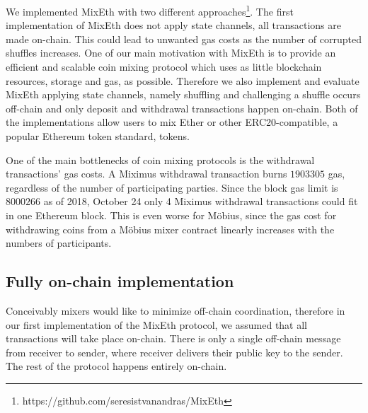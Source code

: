 \documentclass[conference, compsoc]{IEEEtran}
\theoremstyle{definition}
\begin{document}
We implemented MixEth with two different approaches\footnote{https://github.com/seresistvanandras/MixEth}. The first implementation of MixEth does not apply state channels, all transactions are made on-chain. This could lead to unwanted gas costs as the number of corrupted shuffles increases. One of our main motivation with MixEth is to provide an efficient and scalable coin mixing protocol which uses as little blockchain resources, storage and gas, as possible. Therefore we also implement and evaluate MixEth applying state channels, namely shuffling and challenging a shuffle occurs off-chain and only deposit and withdrawal transactions happen on-chain.
Both of the implementations allow users to mix Ether or other ERC20-compatible, a popular Ethereum token standard, tokens.

One of the main bottlenecks of coin mixing protocols is the withdrawal transactions' gas costs. A Miximus withdrawal transaction burns $\num[group-separator={,}]{1903305}$ gas, regardless of the number of participating parties. Since the block gas limit is $\num[group-separator={,}]{8000266}$ as of 2018, October 24 only 4 Miximus withdrawal transactions could fit in one Ethereum block. This is even worse for Möbius, since the gas cost for withdrawing coins from a Möbius mixer contract linearly increases with the numbers of participants.  

\subsection{Fully on-chain implementation} \label{fullyonchainimpl}

Conceivably mixers would like to minimize off-chain coordination, therefore in our first implementation of the MixEth protocol, we assumed that all transactions will take place on-chain. There is only a single off-chain message from receiver to sender, where receiver delivers their public key to the sender. The rest of the protocol happens entirely on-chain.
\end{document}
